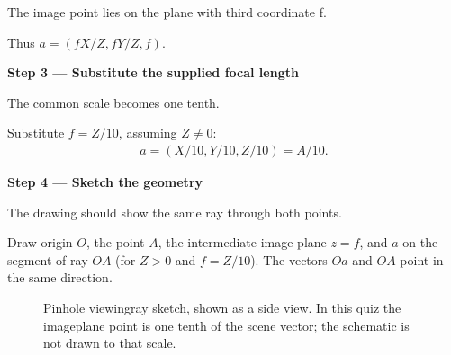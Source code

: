 \documentclass[letterpaper,11pt,english,openany,oneside]{jupyterBook}
\begin{document}
\sphinxAtStartPar
{} The image point lies on the plane with third coordinate f.

\sphinxAtStartPar
Thus {\color{QuizMathBlue} \(a=(fX/Z,fY/Z,f)\)}.

\par

\par\medskip{}
{\color{QuizStepRed}\bfseries Step 3 — Substitute the supplied focal length}\par\smallskip

\sphinxAtStartPar
{} The common scale becomes one tenth.

\sphinxAtStartPar
Substitute {\color{QuizMathBlue} \(f=Z/10\)}, assuming {\color{QuizMathBlue} \(Z\ne0\)}:
{\color{QuizMathBlue} \begin{equation*}
\begin{split}
\boxed{a=(X/10,Y/10,Z/10)=A/10}.
\end{split}
\end{equation*}}
\par

\par\medskip{}
{\color{QuizStepRed}\bfseries Step 4 — Sketch the geometry}\par\smallskip

\sphinxAtStartPar
{} The drawing should show the same ray through both points.

\sphinxAtStartPar
Draw origin {\color{QuizMathBlue} \(O\)}, the point {\color{QuizMathBlue} \(A\)}, the intermediate image plane {\color{QuizMathBlue} \(z=f\)}, and {\color{QuizMathBlue} \(a\)} on the segment of ray {\color{QuizMathBlue} \(OA\)} (for {\color{QuizMathBlue} \(Z>0\)} and {\color{QuizMathBlue} \(f=Z/10\)}). The vectors {\color{QuizMathBlue} \(Oa\)} and {\color{QuizMathBlue} \(OA\)} point in the same direction.

\par

\begin{figure}[H]
\centering
\capstart

\noindent{}
\caption{Pinhole viewing\sphinxhyphen{}ray sketch, shown as a side view. In this quiz the image\sphinxhyphen{}plane point is one tenth of the scene vector; the schematic is not drawn to that scale.}\label{\detokenize{lectures/lecture03/quiz-workbook:id10}}\end{figure}
\end{document}
